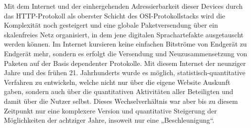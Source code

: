 \documentclass[a4paper,11pt]{article}
\begin{document}
Mit dem Internet und der einhergehenden Adressierbarkeit dieser Devices durch
das HTTP-Protokoll als oberster Schicht des OSI-Protokollstacks wird die
Komplexität noch gesteigert und eine globale Paketversendung über ein
skalenfreies Netz organisiert, in dem jene digitalen Sprachartefakte
ausgetauscht werden können. Im Internet kursieren keine einfachen Bitströme
von Endgerät zu Endgerät mehr, sondern es erfolgt die Versendung und
Neuzusammensetzung von Paketen auf der Basis dependenter Protokolle. Mit
diesem Internet der neunziger Jahre und des frühen 21. Jahrhunderts wurde es
möglich, statistisch-quantitative Verfahren zu entwickeln, welche nicht nur
über die eigene Website Auskunft gaben, sondern auch über die quantitativen
Aktivitäten aller Beteiligten und damit über die Nutzer selbst. Dieses
Wechselverhältnis war aber bis zu diesem Zeitpunkt nur eine komplexere Version
und quantitative Steigerung der Möglichkeiten der achtziger Jahre, insoweit
nur eine „Beschleunigung“.
\end{document}
